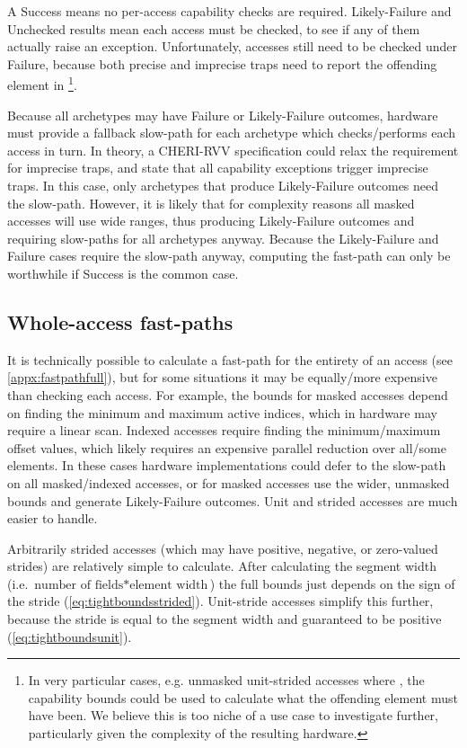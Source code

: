 A Success means no per-access capability checks are required.
Likely-Failure and Unchecked results mean each access must be checked, to see if any of them actually raise an exception.
Unfortunately, accesses still need to be checked under Failure, because both precise and imprecise traps need to report the offending element in \footnote{In very particular cases, e.g. unmasked unit-strided accesses where , the capability bounds could be used to calculate what the offending element must have been. We believe this is too niche of a use case to investigate further, particularly given the complexity of the resulting hardware.}.

Because all archetypes may have Failure or Likely-Failure outcomes, hardware must provide a fallback slow-path for each archetype which checks/performs each access in turn.
In theory, a CHERI-RVV specification could relax the  requirement for imprecise traps, and state that all capability exceptions trigger imprecise traps.
In this case, only archetypes that produce Likely-Failure outcomes need the slow-path.
However, it is likely that for complexity reasons all masked accesses will use wide ranges, thus producing Likely-Failure outcomes and requiring slow-paths for all archetypes anyway.
Because the Likely-Failure and Failure cases require the slow-path anyway, computing the fast-path can only be worthwhile if Success is the common case.

\subsection{Whole-access fast-paths}\label{chap:hardware:subsec:wholeaccessfastpath}
It is technically possible to calculate a fast-path for the entirety of an access (see \cref{appx:fastpathfull}), but for some situations it may be equally/more expensive than checking each access.
For example, the bounds for masked accesses depend on finding the minimum and maximum active indices, which in hardware may require a linear scan.
Indexed accesses require finding the minimum/maximum offset values, which likely requires an expensive parallel reduction over all/some elements.
In these cases hardware implementations could defer to the slow-path on all masked/indexed accesses, or for masked accesses use the wider, unmasked bounds and generate Likely-Failure outcomes.
Unit and strided accesses are much easier to handle.

Arbitrarily strided accesses (which may have positive, negative, or zero-valued strides) are relatively simple to calculate.
After calculating the segment width (i.e. $\text{number of fields} * \text{element width}$) the full bounds just depends on the sign of the stride (\cref{eq:tightboundsstrided}).
Unit-stride accesses simplify this further, because the stride is equal to the segment width and guaranteed to be positive (\cref{eq:tightboundsunit}).

